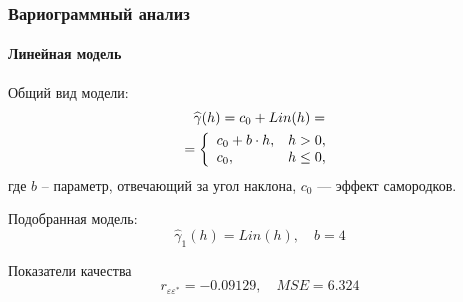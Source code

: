 \documentclass{beamer}
\begin{document}
\begin{frame}
  \frametitle{Вариограммный анализ}
  \framesubtitle{Линейная модель}
  \begin{multicols}{2}
    \begin{small}
      Общий вид модели:
      \begin{equation}\begin{gathered}
        \label{eq:lin}
        \widehat{\gamma}(h) = c_0 + Lin(h) = \\ = \left\{
        \begin{array}{l l}
          c_0 + b \cdot h, & h > 0, \\
          c_0, & h \leq 0,
        \end{array} \right.
      \end{gathered}\end{equation}
      где $ b $ -- параметр, отвечающий за угол наклона, $ c_0 $ --- эффект самородков.
      
      \medskip
      
      Подобранная модель:
      \begin{equation}
        \label{eq:gamma1}
        \widehat{\gamma}_1(h) = Lin(h), \quad b = 4
      \end{equation}
      
      Показатели качества
      \begin{equation*}
        r_{\varepsilon\varepsilon^{*}} = -0.09129, \quad MSE = 6.324
      \end{equation*}
    \end{small}
    

\end{multicols}
\end{frame}
\end{document}
